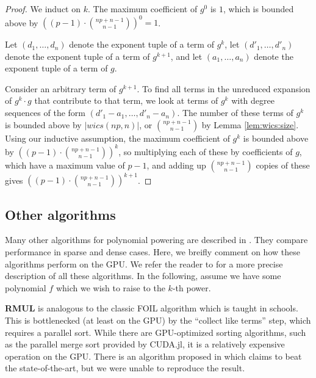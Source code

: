 \begin{proof}
    We induct on $k$. The maximum coefficient of $g^0$ is $1$, which is bounded above by $((p - 1) \cdot \binom{np + n - 1}{n - 1}) ^ 0 = 1$.
    
    Let $(d_1, \dots , d_n)$ denote the exponent tuple of a term of $g^k$, let $(d'_1, \dots , d'_n)$ denote the exponent tuple of a term of $g^{k + 1}$, and let $(a_1, \dots , a_n)$ denote the exponent tuple of a term of $g$.

    Consider an arbitrary term of $g^{k + 1}$. To find all terms in the unreduced expansion of $g^k \cdot g$ that contribute to that term, we look at terms of $g^k$ with degree sequences of the form $(d'_1 - a_1, \dots , d'_n - a_n)$. The number of these terms of $g^k$ is bounded above by $|wics(np, n)|$, or $\binom{np + n - 1}{n - 1}$ by Lemma \ref{lem:wics:size}. Using our inductive assumption, the maximum coefficient of $g^k$ is bounded above by $((p - 1) \cdot \binom{np + n - 1}{n - 1}) ^ k$, so multiplying each of these by coefficients of $g$, which have a maximum value of $p - 1$, and adding up $\binom{np + n - 1}{n - 1}$ copies of these gives $((p - 1) \cdot \binom{np + n - 1}{n - 1}) ^ {k + 1}$.
\end{proof}


\subsection{Other algorithms}

Many other algorithms 
for polynomial powering
are described in \cite{monagan-2012-sparse-powering}. 
They compare performance in sparse and dense cases. 
Here, we breifly comment on how these algorithms perform on the GPU.
We refer the reader to \cite{monagan-2012-sparse-powering}
for a more precise description of all these algorithms.
In the following, assume we have some polynomial \(f\) which we wish 
to raise to the \(k\)-th power.

\textbf{RMUL} is analogous to the classic FOIL algorithm which is taught in schools. 
This is bottlenecked (at least on the GPU) by the ``collect like terms'' step, 
which requires a parallel sort.
While there are GPU-optimized sorting algorithms, such as the parallel merge sort
provided by CUDA.jl, it is a relatively expensive operation on the GPU.
There is an algorithm proposed in \cite{gupta-2023-gpu-sort}
which claims to beat the state-of-the-art, but we were unable to reproduce the result.

